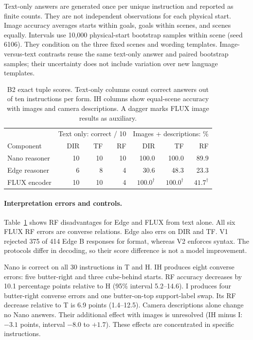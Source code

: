 \documentclass{article}
\begin{document}
Text-only answers are generated once per unique instruction and reported as finite counts. They are not independent observations for each physical start. Image accuracy averages starts within goals, goals within scenes, and scenes equally. Intervals use 10,000 physical-start bootstrap samples within scene (seed 6106). They condition on the three fixed scenes and wording templates. Image-versus-text contrasts reuse the same text-only answer and paired bootstrap samples; their uncertainty does not include variation over new language templates.

\begin{table}[htbp]
\centering\small
\caption{B2 exact tuple scores. Text-only columns count correct answers out of ten instructions per form. IH columns show equal-scene accuracy with images and camera descriptions. A dagger marks FLUX image results as auxiliary.}
\label{tab:vqa-full}
\begin{tabular}{@{}lrrr@{\qquad}rrr@{}}
\toprule
& \multicolumn{3}{c}{Text only: correct / 10}
& \multicolumn{3}{c}{Images + descriptions: \%}\\
Component & DIR & TF & RF & DIR & TF & RF\\
\midrule
Nano reasoner & 10 & 10 & 10 & 100.0 & 100.0 & 89.9\\
Edge reasoner & 6 & 8 & 4 & 30.6 & 48.3 & 23.3\\
FLUX encoder & 10 & 10 & 4 & $100.0^\dagger$ & $100.0^\dagger$ & $41.7^\dagger$\\
\bottomrule
\end{tabular}
\end{table}

\paragraph{Interpretation errors and controls.}
Table~\ref{tab:vqa-full} shows RF disadvantages for Edge and FLUX from text alone. All six FLUX RF errors are converse relations. Edge also errs on DIR and TF. V1 rejected 375 of 414 Edge B responses for format, whereas V2 enforces syntax. The protocols differ in decoding, so their score difference is not a model improvement.

Nano is correct on all 30 instructions in T and H. IH produces eight converse errors: five butter-right and three cube-behind starts. RF accuracy decreases by 10.1 percentage points relative to H (95\% interval 5.2--14.6). I produces four butter-right converse errors and one butter-on-top support-label swap. Its RF decrease relative to T is 6.9 points (1.4--12.5). Camera descriptions alone change no Nano answers. Their additional effect with images is unresolved (IH minus I: $-3.1$ points, interval $-8.0$ to $+1.7$). These effects are concentrated in specific instructions.
\end{document}

